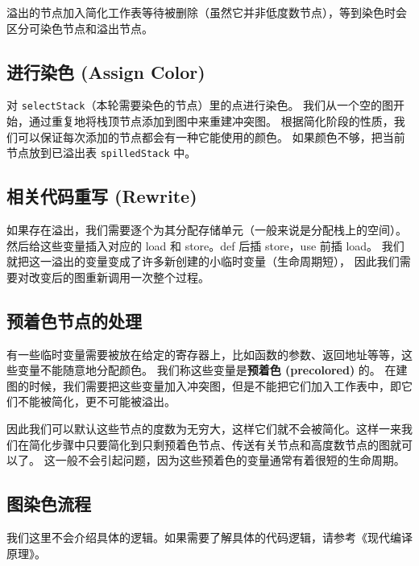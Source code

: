 溢出的节点加入简化工作表等待被删除（虽然它并非低度数节点），等到染色时会区分可染色节点和溢出节点。

\subsection{进行染色 (Assign Color)} \label{opt-graph-assign-color}

对 \texttt{selectStack}（本轮需要染色的节点）里的点进行染色。
我们从一个空的图开始，通过重复地将栈顶节点添加到图中来重建冲突图。
根据简化阶段的性质，我们可以保证每次添加的节点都会有一种它能使用的颜色。
如果颜色不够，把当前节点放到已溢出表 \texttt{spilledStack} 中。

\subsection{相关代码重写 (Rewrite)} \label{opt-graph-rewrite}

如果存在溢出，我们需要逐个为其分配存储单元（一般来说是分配栈上的空间）。
然后给这些变量插入对应的 load 和 store。def 后插 store，use 前插 load。
我们就把这一溢出的变量变成了许多新创建的小临时变量（生命周期短），
因此我们需要对改变后的图重新调用一次整个过程。

\subsection{预着色节点的处理}

有一些临时变量需要被放在给定的寄存器上，比如函数的参数、返回地址等等，这些变量不能随意地分配颜色。
我们称这些变量是\textbf{预着色 (precolored)} 的。
在建图的时候，我们需要把这些变量加入冲突图，但是不能把它们加入工作表中，即它们不能被简化，更不可能被溢出。

因此我们可以默认这些节点的度数为无穷大，这样它们就不会被简化。这样一来我们在简化步骤中只要简化到只剩预着色节点、传送有关节点和高度数节点的图就可以了。
这一般不会引起问题，因为这些预着色的变量通常有着很短的生命周期。

\subsection{图染色流程} \label{opt-graph-workflow}

\begin{remark}
我们这里不会介绍具体的逻辑。如果需要了解具体的代码逻辑，请参考《现代编译原理》\cite{TigerBook}。
\end{remark}

